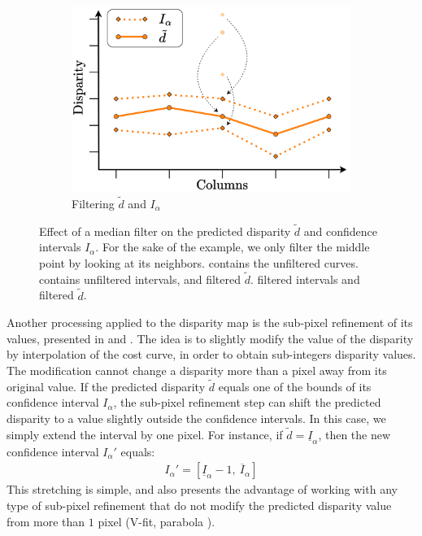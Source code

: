 \begin{figure}
\begin{subfigure}[t]{0.32\linewidth}
        \includegraphics[width=\linewidth]{Images/Chap_5/Median_filtering_3.png}
        \caption{Filtering $\tilde{d}$ and $I_\alpha$}
        \label{fig:median_filtering_3}
    \end{subfigure}
    \caption{Effect of a median filter on the predicted disparity $\tilde{d}$ and confidence intervals $I_\alpha$. For the sake of the example, we only filter the middle point by looking at its neighbors.  contains the unfiltered curves.  contains unfiltered intervals, and filtered $\tilde{d}$.  filtered intervals and filtered $\tilde{d}$.}
    \label{fig:median_filtering}
\end{figure}

Another processing applied to the disparity map is the sub-pixel refinement of its values, presented in  and . The idea is to slightly modify the value of the disparity by interpolation of the cost curve, in order to obtain sub-integers disparity values. The modification cannot change a disparity more than a pixel away from its original value. If the predicted disparity $\tilde{d}$ equals one of the bounds of its confidence interval $I_\alpha$, the sub-pixel refinement step can shift the predicted disparity to a value slightly outside the confidence intervals. In this case, we simply extend the interval by one pixel. For instance, if $\tilde{d}=\underline{I}_\alpha$, then the new confidence interval $I_\alpha'$ equals:
\begin{align}\label{eq:subpixel_intervals}
    I_\alpha'=[\underline{I}_\alpha-1,~\overline{I}_\alpha]
\end{align}
This stretching is simple, and also presents the advantage of working with any type of sub-pixel refinement that do not modify the predicted disparity value from more than $1$ pixel (\ie V-fit, parabola \etc).

